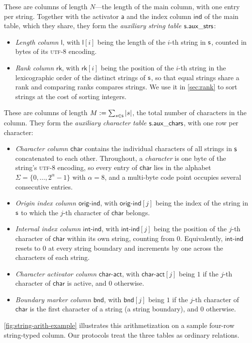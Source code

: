  These are columns of length $N$---the length of the main column, with one entry per string. Together with the activator $\mathsf{a}$ and the index column $\mathsf{ind}$ of the main table, which they share, they form the \emph{auxiliary string table} $\mathsf{s}.\mathsf{aux\_strs}$:
\begin{itemize}[nosep]
    \item \emph{Length column $\mathsf{l}$}, with $\mathsf{l}[i]$ being the length of the $i$-th string in $\mathsf{s}$, counted in bytes of its \textsc{utf-8} encoding.
    \item \emph{Rank column $\mathsf{rk}$}, with $\mathsf{rk}[i]$ being the position of the $i$-th string in the lexicographic order of the distinct strings of $\mathsf{s}$, so that equal strings share a rank and comparing ranks compares strings. We use it in \cref{sec:rank} to sort strings at the cost of sorting integers.
    \end{itemize}
     These are columns of length $M := \sum_{s \in \mathsf{s}} |s|$, the total number of characters in the column. They form the \emph{auxiliary character table} $\mathsf{s}.\mathsf{aux\_chars}$, with one row per character:
   \begin{itemize}[nosep]
    \item \emph{Character column $\mathsf{char}$} contains the individual characters of all strings in $\mathsf{s}$ concatenated to each other. Throughout, a \emph{character} is one byte of the string's \textsc{utf-8} encoding, so every entry of $\mathsf{char}$ lies in the alphabet $\Sigma = \{0, \dots, 2^{\alpha}-1\}$ with $\alpha = 8$, and a multi-byte code point occupies several consecutive entries.
    \item \emph{Origin index column $\mathsf{orig\text{-}ind}$}, with $\mathsf{orig\text{-}ind}[j]$ being the index of the string in $\mathsf{s}$ to which the $j$-th character of $\mathsf{char}$ belongs.
    \item \emph{Internal index column $\mathsf{int\text{-}ind}$}, with $\mathsf{int\text{-}ind}[j]$ being the position of the $j$-th character of $\mathsf{char}$ within its own string, counting from $0$. Equivalently, $\mathsf{int\text{-}ind}$ resets to $0$ at every string boundary and increments by one across the characters of each string.
    \item \emph{Character activator column $\mathsf{char\text{-}act}$}, with $\mathsf{char\text{-}act}[j]$ being $1$ if the $j$-th character of $\mathsf{char}$ is active, and $0$ otherwise.
    \item \emph{Boundary marker column $\mathsf{bnd}$}, with $\mathsf{bnd}[j]$ being $1$ if the $j$-th character of $\mathsf{char}$ is the first character of a string (a string boundary), and $0$ otherwise.
    \end{itemize}
\cref{fig:string-arith-example} illustrates this arithmetization on a sample four-row string-typed column. Our protocols treat the three tables as ordinary relations.

